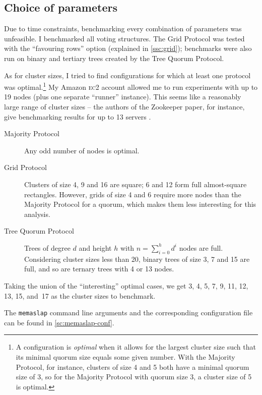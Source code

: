 \documentclass[12pt,chapterprefix=true,toc=bibliography,numbers=noendperiod,
               footnotes=multiple,twoside]{scrreprt}
\newcommand{\ECC}[0]{\textsc{ec}2}
\begin{document}
\subsection{Choice of parameters}

Due to time constraints, benchmarking every combination of parameters was unfeasible. I benchmarked all voting structures. The Grid Protocol was tested with the \enquote{favouring rows} option (explained in \cref{ssc:grid}); benchmarks were also run on binary and tertiary trees created by the Tree Quorum Protocol.

As for cluster sizes, I tried to find configurations for which at least one protocol was optimal.\footnote{A configuration is \emph{optimal} when it allows for the largest cluster size such that its minimal quorum size equals some given number. With the Majority Protocol, for instance, clusters of size 4 and 5 both have a minimal quorum size of 3, so for the Majority Protocol with quorum size 3, a cluster size of 5 is optimal.} My Amazon \ECC{} account allowed me to run experiments with up to 19 nodes (plus one separate \enquote{runner} instance). This seems like a reasonably large range of cluster sizes -- the authors of the Zookeeper paper, for instance, give benchmarking results for up to 13 servers \autocite{zookeeper}.

\begin{description}
    \item[Majority Protocol] Any odd number of nodes is optimal.
    \item[Grid Protocol] Clusters of size 4, 9 and 16 are square; 6 and 12 form full almost-square rectangles. However, grids of size 4 and 6 require more nodes than the Majority Protocol for a quorum, which makes them less interesting for this analysis.
    \item[Tree Quorum Protocol] Trees of degree \(d\) and height \(h\) with \(n = \sum^h_{i=0} d^i\) nodes are full. Considering cluster sizes less than 20, binary trees of size 3, 7 and 15 are full, and so are ternary trees with 4 or 13 nodes.
\end{description}

Taking the union of the \enquote{interesting} optimal cases, we get 3, 4, 5, 7, 9, 11, 12, 13, 15, and~17 as the cluster sizes to benchmark.

The \texttt{memaslap} command line arguments and the corresponding configuration file can be found in \cref{sc:memaslap-conf}.

\end{document}
